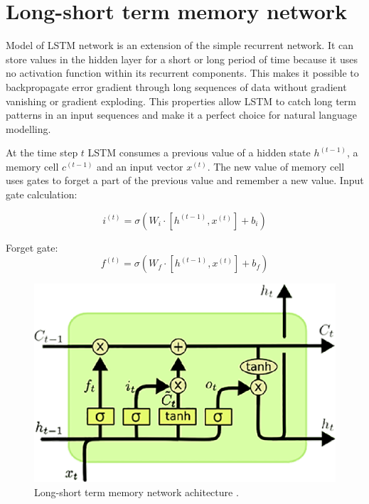 \section{Long-short term memory network}
Model of LSTM network is an extension of the simple recurrent network. It can store values in the hidden layer for a short or long period of time because it uses no activation function within its recurrent components. This makes it possible to backpropagate error gradient through long sequences of data without gradient vanishing or gradient exploding. This properties allow LSTM to catch long term patterns in an input sequences and make it a perfect choice for natural language modelling.

At the time step $t$ LSTM consumes a previous value of a hidden state $h^{(t-1)}$, a memory cell $c^{(t-1)}$ and an input vector $x^{(t)}$. The new value of memory cell uses gates to forget a part of the previous value and remember a new value. Input gate calculation:

\begin{equation}
i^{(t)}=\sigma(W_i\cdot[h^{(t-1)}, x^{(t)}]+b_i)
\label{lstm:input}
\end{equation} 

Forget gate:
\begin{equation}
f^{(t)} = \sigma(W_f\cdot[h^{(t-1)},x^{(t)}] + b_f)
\label{lstm:ft}
\end{equation} 

\begin{figure}[h]
\centering
\includegraphics{Figures/lstm}
\decoRule
\caption[Long-short term memory]{Long-short term memory network achitecture \parencite{lstm-picture}.}
\label{fig:word_embeddings}
\end{figure}

